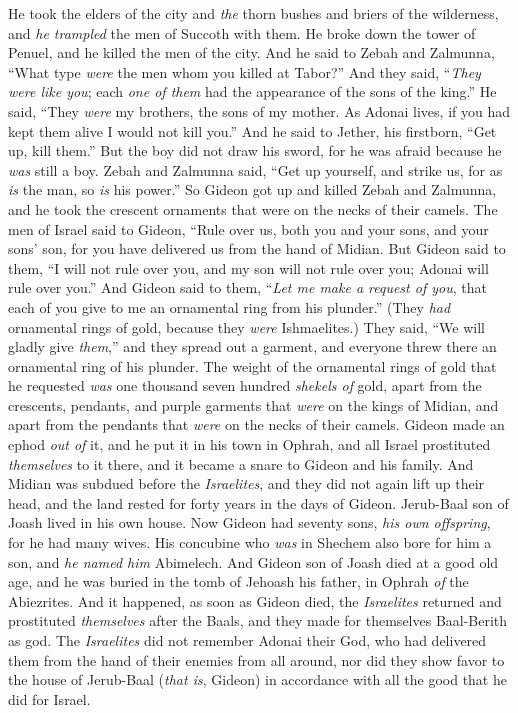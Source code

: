\begin{biblechapter}
\verse He took the elders of the city and \textit{the} thorn bushes and briers of the wilderness, and \textit{he trampled} the men of Succoth with them.
\verse He broke down the tower of Penuel, and he killed the men of the city.
\verse And he said to Zebah and Zalmunna, “What type \textit{were} the men whom you killed at Tabor?” And they said, “\textit{They were like you}; each \textit{one of them} had the appearance of the sons of the king.”
\verse He said, “They \textit{were} my brothers, the sons of my mother. As Adonai lives, if you had kept them alive I would not kill you.”
\verse And he said to Jether, his firstborn, “Get up, kill them.” But the boy did not draw his sword, for he was afraid because he \textit{was} still a boy.
\verse Zebah and Zalmunna said, “Get up yourself, and strike us, for as \textit{is} the man, so \textit{is} his power.” So Gideon got up and killed Zebah and Zalmunna, and he took the crescent ornaments that were on the necks of their camels.
\verse The men of Israel said to Gideon, “Rule over us, both you and your sons, and your sons’ son, for you have delivered us from the hand of Midian.
\verse But Gideon said to them, “I will not rule over you, and my son will not rule over you; Adonai will rule over you.”
\verse And Gideon said to them, “\textit{Let me make a request of you}, that each of you give to me an ornamental ring from his plunder.” (They \textit{had} ornamental rings of gold, because they \textit{were} Ishmaelites.)
\verse They said, “We will gladly give \textit{them},” and they spread out a garment, and everyone threw there an ornamental ring of his plunder.
\verse The weight of the ornamental rings of gold that he requested \textit{was} one thousand seven hundred \textit{shekels of} gold, apart from the crescents, pendants, and purple garments that \textit{were} on the kings of Midian, and apart from the pendants that \textit{were} on the necks of their camels.
\verse Gideon made an ephod \textit{out of} it, and he put it in his town in Ophrah, and all Israel prostituted \textit{themselves} to it there, and it became a snare to Gideon and his family.
\verse And Midian was subdued before the \textit{Israelites}, and they did not again lift up their head, and the land rested for forty years in the days of Gideon.
 Jerub-Baal son of Joash lived in his own house.
\verse Now Gideon had seventy sons, \textit{his own offspring}, for he had many wives.
\verse His concubine who \textit{was} in Shechem also bore for him a son, and \textit{he named him} Abimelech.
\verse And Gideon son of Joash died at a good old age, and he was buried in the tomb of Jehoash his father, in Ophrah \textit{of} the Abiezrites.
\verse And it happened, as soon as Gideon died, the \textit{Israelites} returned and prostituted \textit{themselves} after the Baals, and they made for themselves Baal-Berith as god.
\verse The \textit{Israelites} did not remember Adonai their God, who had delivered them from the hand of their enemies from all around,
\verse nor did they show favor to the house of Jerub-Baal (\textit{that is}, Gideon) in accordance with all the good that he did for Israel.
\end{biblechapter}

